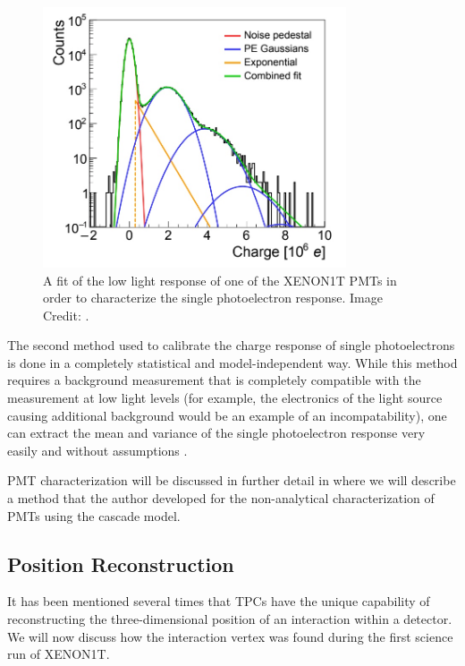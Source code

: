 \begin{figure}[t]
	\centering
	\includegraphics[width=0.8\textwidth]{xe1t_spe_gaussian}
	\caption{A fit of the low light response of one of the XENON1T PMTs in order to characterize the single photoelectron response.  Image Credit: .}
	\label{fig:xe1t_spe_gaussian}
\end{figure}


The second method used to calibrate the charge response of single photoelectrons is done in a completely statistical and model-independent way.  While this method requires a background measurement that is completely compatible with the measurement at low light levels (for example, the electronics of the light source causing additional background would be an example of an incompatability), one can extract the mean and variance of the single photoelectron response very easily and without assumptions \cite{saldanha2017model}.

PMT characterization will be discussed in further detail in  where we will describe a method that the author developed for the non-analytical characterization of PMTs using the cascade model.




\subsection{Position Reconstruction}
\label{sec:xe1t_pos_rec}

It has been mentioned several times that TPCs have the unique capability of reconstructing the three-dimensional position of an interaction within a detector.  We will now discuss how the interaction vertex was found during the first science run of XENON1T.

